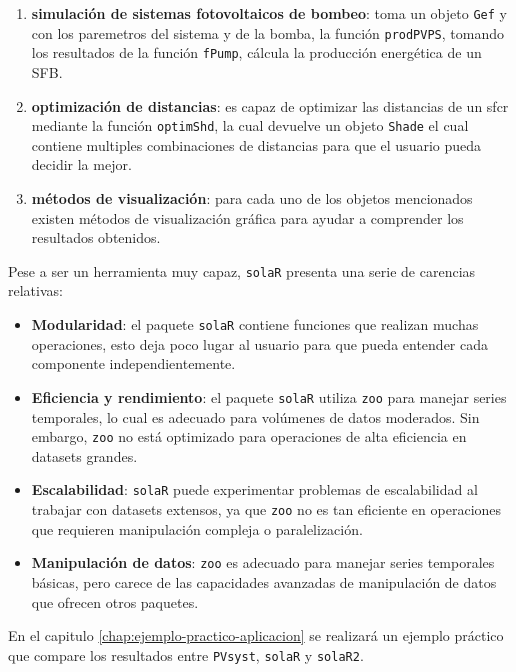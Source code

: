 \begin{enumerate}
\item \textbf{simulación de sistemas fotovoltaicos de bombeo}: toma un objeto \texttt{Gef} y con los paremetros del sistema y de la bomba, la función \texttt{prodPVPS}, tomando los resultados de la función \texttt{fPump}, cálcula la producción energética de un SFB.
\item \textbf{optimización de distancias}: es capaz de optimizar las distancias de un sfcr mediante la función \texttt{optimShd}, la cual devuelve un objeto \texttt{Shade} el cual contiene multiples combinaciones de distancias para que el usuario pueda decidir la mejor.
\item \textbf{métodos de visualización}: para cada uno de los objetos mencionados existen métodos de visualización gráfica para ayudar a comprender los resultados obtenidos.
\end{enumerate}

Pese a ser un herramienta muy capaz, \texttt{solaR} presenta una serie de carencias relativas:
\begin{itemize}
\item \textbf{Modularidad}: el paquete \texttt{solaR} contiene funciones que realizan muchas operaciones, esto deja poco lugar al usuario para que pueda entender cada componente independientemente.
\item \textbf{Eficiencia y rendimiento}: el paquete \texttt{solaR} utiliza \texttt{zoo} para manejar series temporales, lo cual es adecuado para volúmenes de datos moderados. Sin embargo, \texttt{zoo} no está optimizado para operaciones de alta eficiencia en datasets grandes.
\item \textbf{Escalabilidad}: \texttt{solaR} puede experimentar problemas de escalabilidad al trabajar con datasets extensos, ya que \texttt{zoo} no es tan eficiente en operaciones que requieren manipulación compleja o paralelización.
\item \textbf{Manipulación de datos}: \texttt{zoo} es adecuado para manejar series temporales básicas, pero carece de las capacidades avanzadas de manipulación de datos que ofrecen otros paquetes.
\end{itemize}

En el capitulo \ref{chap:ejemplo-practico-aplicacion} se realizará un ejemplo práctico que compare los resultados entre \texttt{PVsyst}, \texttt{solaR} y \texttt{solaR2}.
